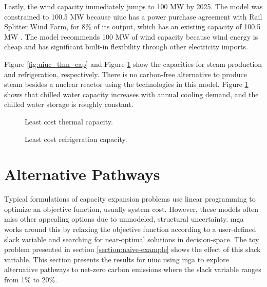 Lastly, the wind capacity immediately jumps to 100 MW by 2025. The model was
constrained to 100.5 MW because \gls{uiuc} has a power purchase agreement with
Rail Splitter Wind Farm, for 8\% of its output, which has an existing capacity of
100.5 MW  \cite{breitweiser_wind_2016}. The model recommends 100 MW of wind
capacity because wind energy is cheap and has significant built-in flexibility
through other electricity imports.

Figure \ref{fig:uiuc_thm_cap} and Figure \ref{fig:uiuc_chw_cap} show the capacities
for steam production and refrigeration, respectively. There is no carbon-free
alternative to produce steam besides a nuclear reactor using the technologies
in this model. Figure
\ref{fig:uiuc_chw_cap} shows that chilled water capacity increases with annual
cooling demand, and the chilled water storage is roughly constant.

\begin{figure}[H]
  \begin{minipage}{0.48\textwidth}
    \captionsetup{type=figure}
    \centering
    \resizebox{\columnwidth}{!}{}
    \caption[]{Least cost thermal capacity.}
    \label{fig:uiuc_thm_cap}
  \end{minipage}
  \begin{minipage}{0.48\textwidth}
    \centering
    \resizebox{\columnwidth}{!}{}
    \caption[]{Least cost refrigeration capacity.}
    \label{fig:uiuc_chw_cap}
  \end{minipage}
\end{figure}

\section{Alternative Pathways}

Typical formulations of capacity expansion problems use linear programming to optimize
an objective function, usually system cost. However, these models often miss
other appealing options due to unmodeled, structural uncertainty. \gls{mga}
works around this by relaxing the objective function according to a user-defined
slack variable and searching for near-optimal solutions in decision-space.
The toy problem presented in section \ref{section:naive-example} shows the effect
of this slack variable.
This section presents the results for \gls{uiuc} using \gls{mga} to explore
alternative pathways to net-zero carbon emissions where the slack variable ranges
from 1\% to 20\%.

